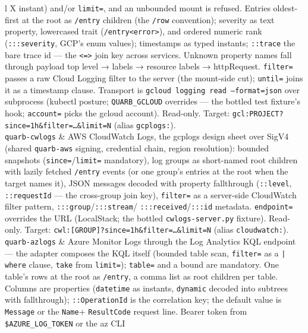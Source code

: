 \documentclass{report}
\begin{document}
\begin{xltabular}{\textwidth}{l X}
  instant) and/or \texttt{limit=}, and an unbounded mount is
  refused. Entries oldest-first at the root as \texttt{/entry}
  children (the \texttt{/row} convention); severity as text
  property, lowercased trait
  (\texttt{/entry<error>}), and ordered numeric rank
  (\texttt{:::severity}, GCP's enum values); timestamps as
  typed instants; \texttt{::trace} the bare trace id — the
  \texttt{<=>} join key across services. Unknown property
  names fall through payload top level → labels → resource
  labels → httpRequest. \texttt{filter=} passes a raw Cloud
  Logging filter to the server (the mount-side cut);
  \texttt{until=} joins it as a timestamp clause. Transport is
  \texttt{gcloud logging read --format=json} over subprocess
  (kubectl posture; \texttt{QUARB\_GCLOUD} overrides —
  the bottled test fixture's hook; \texttt{account=} picks the
  gcloud account). Read-only. Target:
  \texttt{gcl:PROJECT?since=1h\&filter=…\&limit=N} (alias
  \texttt{gcplogs:}). \\
\texttt{quarb-cwlogs} & AWS CloudWatch Logs, the gcplogs
  design sheet over SigV4 (shared \texttt{quarb-aws} signing,
  credential chain, region resolution): bounded snapshots
  (\texttt{since=}/\texttt{limit=} mandatory), log groups as
  short-named root children with lazily fetched \texttt{/entry}
  events (or one group's entries at the root when the target
  names it), JSON messages decoded with property fallthrough
  (\texttt{::level}, \texttt{::requestId} — the cross-group
  join key), \texttt{filter=} as a server-side CloudWatch
  filter pattern, \texttt{:::group}/\texttt{:::stream}/
  \texttt{:::received}/\texttt{:::id} metadata.
  \texttt{endpoint=} overrides the URL (LocalStack; the
  bottled \texttt{cwlogs-server.py} fixture). Read-only.
  Target: \texttt{cwl:[GROUP]?since=1h\&filter=…\&limit=N}
  (alias \texttt{cloudwatch:}). \\
\texttt{quarb-azlogs} & Azure Monitor Logs through the Log
  Analytics KQL endpoint — the adapter composes the KQL itself
  (bounded table scan, \texttt{filter=} as a \texttt{| where}
  clause, \texttt{take} from \texttt{limit=}); \texttt{table=}
  and a bound are mandatory. One table's rows at the root as
  \texttt{/entry}, a comma list as root children per table.
  Columns are properties (\texttt{datetime} as instants,
  \texttt{dynamic} decoded into subtrees with fallthrough);
  \texttt{::OperationId} is the correlation key; the default
  value is \texttt{Message} or the \texttt{Name}+
  \texttt{ResultCode} request line. Bearer token from
  \texttt{\$AZURE\_LOG\_TOKEN} or the az CLI

\end{xltabular}
\end{document}
